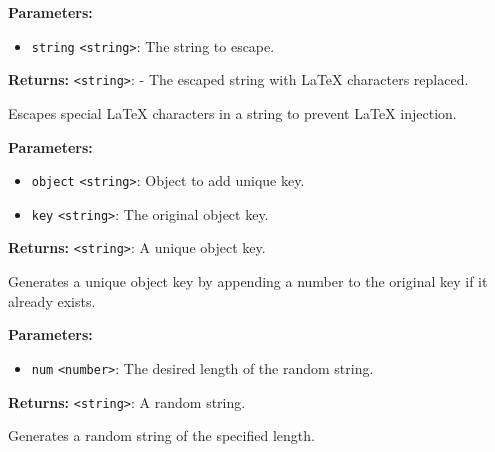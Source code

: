 \documentclass[12pt,a4paper]{article}
\begin{document}
\vspace{5mm}
\noindent {}


\noindent \textbf{Parameters:}
\begin{itemize}
  \item \texttt{string} \texttt{<string>}: The string to escape.
\end{itemize}

\noindent \textbf{Returns:} \texttt{<string>}: - The escaped string with LaTeX characters replaced.

\noindent Escapes special LaTeX characters in a string to prevent LaTeX injection.

\vspace{5mm}
\noindent {}


\noindent \textbf{Parameters:}
\begin{itemize}
  \item \texttt{object} \texttt{<string>}: Object to add unique key.
  \item \texttt{key} \texttt{<string>}: The original object key.
\end{itemize}

\noindent \textbf{Returns:} \texttt{<string>}: A unique object key.

\noindent Generates a unique object key by appending a number to the original key if it already exists.

\vspace{5mm}
\noindent {}


\noindent \textbf{Parameters:}
\begin{itemize}
  \item \texttt{num} \texttt{<number>}: The desired length of the random string.
\end{itemize}

\noindent \textbf{Returns:} \texttt{<string>}: A random string.

\noindent Generates a random string of the specified length.

\vspace{5mm}
\noindent {}
\end{document}
